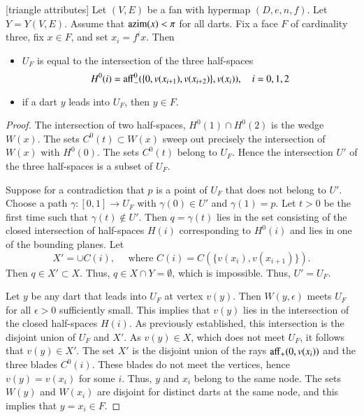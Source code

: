 \begin{lemma}[triangle attributes] \label{lemma:triangle}
Let $(V,E)$ be a fan with hypermap $(D,e,n,f)$. 
Let $Y=Y(V,E)$.
Assume that ${\operatorname{azim}}(x)<\pi$
for all darts.  Fix a face $F$ of cardinality three, fix
$x\in F$, and set $x_i = f^i x$. Then
\begin{itemize}  
\item $U_F$ is equal to the intersection of the three half-spaces
$$H^0(i)={\operatorname{aff}}_-^0(\{0,v(x_{i+1}),v(x_{i+2})\},v(x_i)),\quad i=0,1,2$$
\item if a dart $y$ leads into $U_F$, then $y\in F$.
\end{itemize}
\end{lemma}

\begin{proof} The intersection of two half-spaces, $H^0(1)\cap H^0(2)$ is
the wedge $W(x)$.   The sets $C^0(t)\subset W(x)$ sweep out precisely
the intersection of $W(x)$ with $H^0(0)$.  The sets $C^0(t)$ belong to
$U_F$.  Hence the intersection $U'$ of the three half-spaces is a subset of $U_F$.

Suppose for a contradiction 
that $p$ is a point of $U_F$ that does not belong to $U'$.  Choose a path $\gamma:[0,1]\to U_F$ with $\gamma(0)\in U'$ and $\gamma(1)=p$.  Let $t>0$ be the first time such that $\gamma(t)\not\in U'$.  Then $q=\gamma(t)$ lies in the set consisting of the closed intersection of half-spaces $H(i)$ corresponding to $H^0(i)$ and lies
in one of the bounding planes.  Let 
$$
X' = \cup C(i),\quad\text{ where } C(i)=C(\{v(x_i),v(x_{i+1})\}).
$$
Then $q\in X'\subset X$.  Thus,
$q\in X\cap Y = \emptyset$, which is impossible.  Thus, $U'=U_F$.

Let $y$ be any dart that leads into $U_F$ at vertex $v(y)$.  Then
$W(y,\epsilon)$ meets $U_F$ for all $\epsilon>0$ sufficiently small.
This implies that $v(y)$ lies in the intersection of the closed half-spaces $H(i)$.  As previously established, this intersection is the disjoint union of $U_F$ and
$X'$.  As $v(y)\in X$, which does not meet $U_F$, it follows that $v(y)\in X'$.
The set $X'$ is the disjoint union of the rays ${\operatorname{aff}}_+(0,v(x_i))$ and
the three blades $C^0(i)$.  These blades do not meet the vertices, hence
$v(y)=v(x_i)$ for some $i$.  Thus, $y$ and $x_i$ belong to the same
node.  The sets $W(y)$ and $W( x_i)$ are disjoint for distinct darts at the same
node, and this implies that $y=x_i\in F$.
\end{proof}

